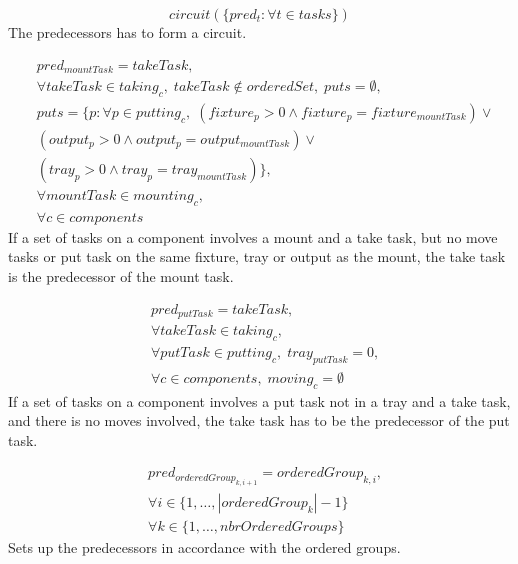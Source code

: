 \documentclass[10pt,a4paper]{report}
\begin{document}
\begin{equation}\label{eq:111}
circuit(\{pred_t : \forall t \in tasks\})\end{equation}
The predecessors has to form a circuit.

\begin{equation}
\begin{aligned}\label{eq:112}
&pred_{mountTask} = takeTask, \\
&\forall takeTask \in taking_c, \; takeTask \notin orderedSet, \; puts = \emptyset, \\
&puts = \{p : \forall p \in putting_c, \; (fixture_p > 0 \land fixture_p = fixture_{mountTask}) \lor  \\
&(output_p > 0 \land output_p = output_{mountTask}) \lor  \\
&(tray_p > 0 \land tray_p = tray_{mountTask})\}, \\
&\forall mountTask \in mounting_c, \\
&\forall c \in components
\end{aligned}
\end{equation}
If a set of tasks on a component involves a mount and a take task, but no move tasks or put task on the same fixture, tray or output as the mount, the take task is the predecessor of the mount task.

\begin{equation}
\begin{aligned}\label{eq:113}
&pred_{putTask} = takeTask, \\
&\forall takeTask \in taking_c, \\
&\forall putTask \in putting_c, \; tray_{putTask} = 0, \\
&\forall c \in components, \; moving_c = \emptyset
\end{aligned}
\end{equation}
If a set of tasks on a component involves a put task not in a tray and a take task, and there is no moves involved, the take task has to be the predecessor of the put task.

\begin{equation}
\begin{aligned}\label{eq:114}
&pred_{orderedGroup_{k, i + 1}} = orderedGroup_{k, i}, \\
&\forall i \in \{1 , \ldots , |orderedGroup_k|-1\} \\
&\forall k \in \{1 , \ldots , nbrOrderedGroups\}
\end{aligned}
\end{equation}
Sets up the predecessors in accordance with the ordered groups.
\end{document}
